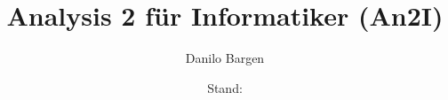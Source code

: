 



\subject{Hochschule für Technik Rapperswil}
\title{Analysis 2 für Informatiker (An2I)}
\author{Danilo Bargen}
\date{Stand: \revisiondate}
















